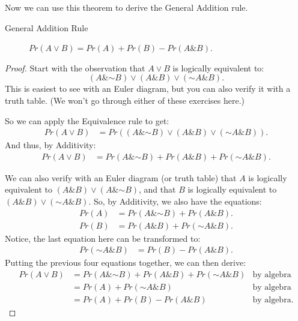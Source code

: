 \documentclass[justified]{tufte-book}
\renewcommand{\neg}{\mathbin{\sim}}
\renewcommand{\wedge}{\mathbin{\&}}
\newcommand{\p}{Pr}
\theoremstyle{definition}
\theoremstyle{definition}
\theoremstyle{definition}
\theoremstyle{definition}
\theoremstyle{remark}
\begin{document}
Now we can use this theorem to derive the General Addition rule.

\begin{description}
\item[General Addition Rule]
\(\p(A \vee B) = \p(A) + \p(B) - \p(A \wedge B)\).
\end{description}

\begin{proof}
{}
Start with the observation that \(A \vee B\) is logically equivalent to:
\[ (A \wedge \neg B) \vee (A \wedge B) \vee (\neg A \wedge B). \]
This is easiest to see with an Euler diagram, but you can also verify it with a truth table. (We won't go through either of these exercises here.)

So we can apply the Equivalence rule to get:
\[
  \begin{aligned}
    \p(A \vee B) &= \p((A \wedge \neg B) \vee (A \wedge B) \vee (\neg A \wedge B)).
  \end{aligned}
\]
And thus, by Additivity:
\[
  \begin{aligned}
    \p(A \vee B) &= \p(A \wedge \neg B) + \p(A \wedge B) + \p(\neg A \wedge B).
  \end{aligned}
\]

We can also verify with an Euler diagram (or truth table) that \(A\) is logically equivalent to \((A \wedge B) \vee (A \wedge \neg B)\), and that \(B\) is logically equivalent to \((A \wedge B) \vee (\neg A \wedge B)\). So, by Additivity, we also have the equations:
\[
  \begin{aligned}
    \p(A) &= \p(A \wedge \neg B) + \p(A \wedge B).\\
    \p(B) &= \p(A \wedge B) + \p(\neg A \wedge B).
  \end{aligned}
\]
Notice, the last equation here can be transformed to:
\[
  \begin{aligned}
    \p(\neg A \wedge B) &= \p(B) - \p(A \wedge B).
  \end{aligned}
\]
Putting the previous four equations together, we can then derive:
\[
  \begin{aligned}
    \p(A \vee B) &= \p(A \wedge \neg B) + \p(A \wedge B) + \p(\neg A \wedge B) & \mbox{by algebra}\\
                 &= \p(A) + \p(\neg A \wedge B) & \mbox{by algebra}\\
                 &= \p(A) + \p(B) - \p(A \wedge B) & \mbox{by algebra.}
  \end{aligned}
\]
\end{proof}
\end{document}
